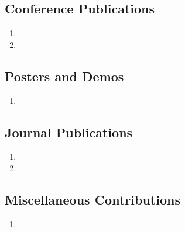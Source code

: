 \subsection*{Conference Publications}

\begin{enumerate}

\item {}
\item {}

\end{enumerate}

\subsection*{Posters and Demos}

\begin{enumerate}
\item {}

\end{enumerate}

\subsection*{Journal Publications}

\begin{enumerate}
\item {}
\item {}

\end{enumerate}

\subsection*{Miscellaneous Contributions}

\begin{enumerate}
\item {}
\end{enumerate}
